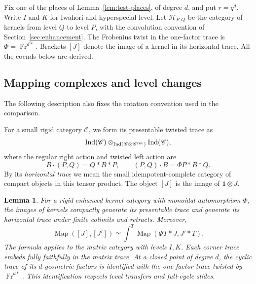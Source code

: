 \documentclass[11pt]{article}
\numberwithin{equation}{section}
\newtheorem{lemma}[theorem]{Lemma}
\theoremstyle{definition}
\theoremstyle{remark}
\newcommand{\Fr}{\operatorname{Fr}}
\newcommand{\Map}{\operatorname{Map}}
\newcommand{\Ind}{\operatorname{Ind}}
\begin{document}
Fix one of the places of Lemma~\ref{lem:test-places}, of degree $d$, and
put $r=q^d$.  Write $I$ and $K$ for Iwahori and hyperspecial level.
Let $\mathscr H_{P,Q}$ be the category of kernels from level $Q$ to
level $P$, with the convolution convention of
Section~\ref{sec:enhancement}.  The Frobenius twist in the one-factor
trace is $\Phi=\Fr^{d*}$.  Brackets $[J]$ denote the image of a kernel
in its horizontal trace.  All the coends below are derived.

\subsection{Mapping complexes and level changes}

The following description also fixes the rotation convention used in
the comparison.

For a small rigid category $\mathscr C$, we form its presentable
twisted trace as
\[
 \Ind(\mathscr C)\mathbin{\otimes}_{
   \Ind(\mathscr C\otimes\mathscr C^{\rm rev})}
 \Ind(\mathscr C),
\]
where the regular right action and twisted left action are
\[
 B\cdot(P,Q)=Q*B*P,
 \qquad (P,Q)\cdot B=\Phi P*B*Q.
\]
By its \emph{horizontal trace} we mean the small idempotent-complete
category of compact objects in this tensor product.  The object
$[J]$ is the image of $\mathbf1\otimes J$.

\begin{lemma}\label{trace:coend}
For a rigid enhanced kernel category with monoidal automorphism $\Phi$,
the images of kernels compactly generate its presentable trace and
generate its horizontal trace under finite colimits and retracts.  Moreover,
\begin{equation}\label{eq:horizontal-trace}
 \Map([J],[J'])
   \simeq \int^{T}\Map(\Phi T*J,J'*T).
\end{equation}
The formula applies to the matrix category with levels $I,K$.  Each
corner trace embeds fully faithfully in the matrix trace.  At a closed
point of degree $d$, the cyclic trace of its $d$ geometric factors is
identified with the one-factor trace twisted by $\Fr^{d*}$.  This
identification respects level transfers and full-cycle slides.
\end{lemma}
\end{document}
